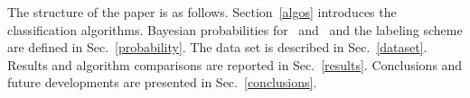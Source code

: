 The structure of the paper is as follows. Section~\ref{algos} introduces the classification algorithms. Bayesian probabilities for \hasns\ and \hasrem\ and the labeling scheme are defined in
Sec.~\ref{probability}. The data set is described in Sec.~\ref{dataset}. Results and algorithm comparisons are reported in Sec.~\ref{results}. Conclusions and future developments are presented in Sec.~\ref{conclusions}.  
